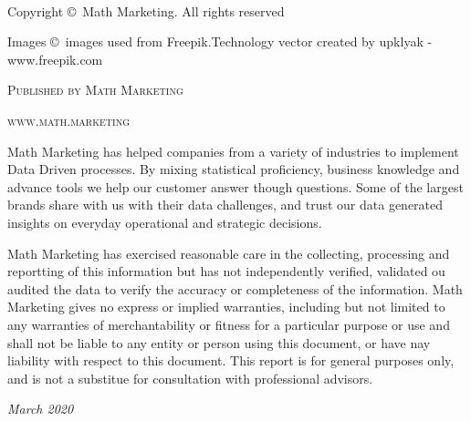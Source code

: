 \newpage
~\vfill
\thispagestyle{empty}
\NoBgThispage

\noindent \textcolor{DarkPurple}{Copyright \copyright\ Math Marketing. All rights reserved \\} %

\noindent \textcolor{DarkPurple}{Images \copyright\ images used from Freepik.Technology vector created by upklyak - www.freepik.com \\}

\noindent \textcolor{DarkPurple}{\textsc{Published by Math Marketing}\\} %

\noindent \textcolor{DarkPurple}{\textsc{www.math.marketing}\\} %

\noindent \textcolor{DarkPurple}{Math Marketing has helped companies from a variety of industries to implement Data Driven processes. By mixing statistical proficiency, business knowledge and advance tools we help our customer answer though questions. Some of the largest brands share with us with their data challenges, and trust our data generated insights on everyday operational and strategic decisions.\\} %

\noindent \textcolor{DarkPurple}{Math Marketing has exercised reasonable care in the collecting, processing and reportting of this information but has not independently verified, validated ou audited the data to verify the accuracy or completeness of the information. Math Marketing gives no express or implied warranties, including but not limited to any warranties of merchantability or fitness for a particular purpose or use and shall not be liable to any entity or person using this document, or have nay liability with respect to this document. This report is for general purposes only, and is not a substitue for consultation with professional advisors.\\} %

\noindent \textcolor{DarkPurple}{\textit{March 2020}} %